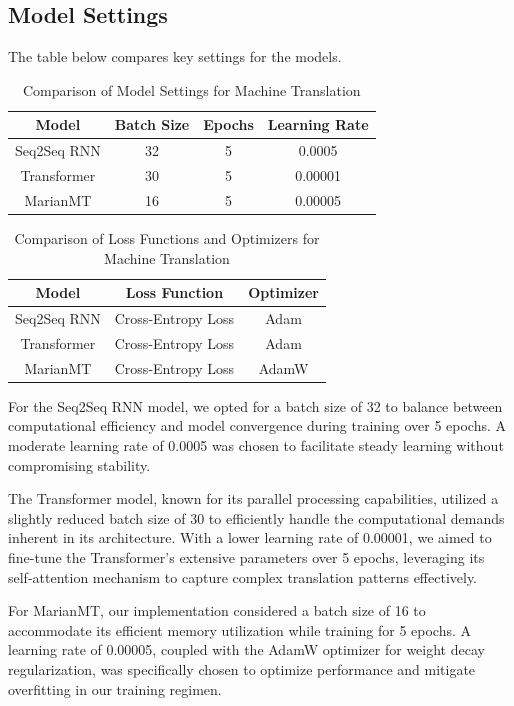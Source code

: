 \documentclass{article}
\begin{document}
\subsection{Model Settings}
The table below compares key settings for the models.

\begin{table}[H]
\centering
\begin{tabular}{|c|c|c|c|}
\hline
\textbf{Model} & \textbf{Batch Size} & \textbf{Epochs} & \textbf{Learning Rate} \\
\hline
Seq2Seq RNN & 32 & 5 & 0.0005 \\
Transformer & 30 & 5 & 0.00001 \\
MarianMT & 16 & 5 & 0.00005 \\
\hline
\end{tabular}
\caption{Comparison of Model Settings for Machine Translation}
\label{table:model_settings}
\end{table}

\begin{table}[H]
\centering
\begin{tabular}{|c|c|c|}
\hline
\textbf{Model} & \textbf{Loss Function} & \textbf{Optimizer} \\
\hline
Seq2Seq RNN & Cross-Entropy Loss & Adam \\
Transformer & Cross-Entropy Loss & Adam \\
MarianMT & Cross-Entropy Loss & AdamW \\
\hline
\end{tabular}
\caption{Comparison of Loss Functions and Optimizers for Machine Translation}
\label{table:loss_optimizer}
\end{table}
For the Seq2Seq RNN model, we opted for a batch size of 32 to balance between computational efficiency and model convergence during training over 5 epochs. A moderate learning rate of 0.0005 was chosen to facilitate steady learning without compromising stability.

The Transformer model, known for its parallel processing capabilities, utilized a slightly reduced batch size of 30 to efficiently handle the computational demands inherent in its architecture. With a lower learning rate of 0.00001, we aimed to fine-tune the Transformer's extensive parameters over 5 epochs, leveraging its self-attention mechanism to capture complex translation patterns effectively.

For MarianMT, our implementation considered a batch size of 16 to accommodate its efficient memory utilization while training for 5 epochs. A learning rate of 0.00005, coupled with the AdamW optimizer for weight decay regularization, was specifically chosen to optimize performance and mitigate overfitting in our training regimen.
\end{document}
